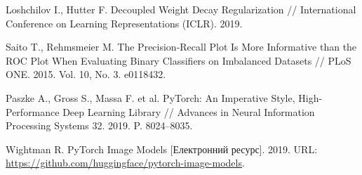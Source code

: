 \documentclass[14pt,a4paper]{extreport}
\begin{document}
\begin{enumerate}[label={[\arabic*]},ref={\arabic*},leftmargin=*,labelindent=0pt]
\item \label{ref:adamw} Loshchilov I., Hutter F. Decoupled Weight Decay Regularization // International Conference on Learning Representations (ICLR). 2019.
\item \label{ref:saito} Saito T., Rehmsmeier M. The Precision-Recall Plot Is More Informative than the ROC Plot When Evaluating Binary Classifiers on Imbalanced Datasets // PLoS ONE. 2015. Vol. 10, No. 3. e0118432.
\item \label{ref:pytorch} Paszke A., Gross S., Massa F. et al. PyTorch: An Imperative Style, High-Performance Deep Learning Library // Advances in Neural Information Processing Systems 32. 2019. P. 8024--8035.
\item \label{ref:timm} Wightman R. PyTorch Image Models [Електронний ресурс]. 2019. URL: \url{https://github.com/huggingface/pytorch-image-models}.
\end{enumerate}
\end{document}
